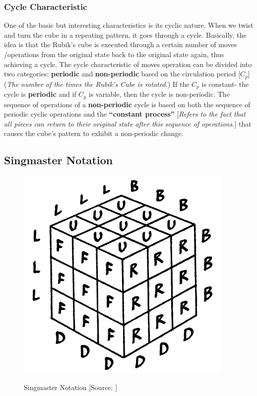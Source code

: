 \documentclass[12pt,a4paper]{article}
\theoremstyle{custom}
\begin{document}
\subsubsection{Cycle Characteristic}
One of the basic but interesting characteristics is its cyclic nature. 
When we twist and turn the cube in a repeating pattern, it goes through a cycle. Basically, the idea is that the Rubik's cube is executed through a certain
number of moves /operations from the original state back to the original state again, thus achieving a cycle. The cycle characteristic of moves operation can be
divided into two categories: \textbf{periodic} and \textbf{non-periodic} based on the circulation period [$C_p$] (\textit{The number of the times the Rubik's Cube is rotated.})
If the $C_p$ is constant- the cycle is \textbf{periodic} and if $C_p$ is variable, then the cycle is non-periodic. The sequence of operations of a \textbf{non-periodic} cycle is
based on both the sequence of periodic cyclic operations
and the \textbf{“constant process”} [\textit{Refers to
the fact that all pieces can return to their original state
after this sequence of operations.}] that causes the cube’s pattern to exhibit a non-periodic change.


\subsection{Singmaster Notation}

\begin{figure}[H]
\centering
\includegraphics[scale=0.5]{SingNotation.png} \\
\caption{Singmaster Notation [Source: \cite{singmaster1980notes}]}
\label{Sing}
\end{figure}
\end{document}
